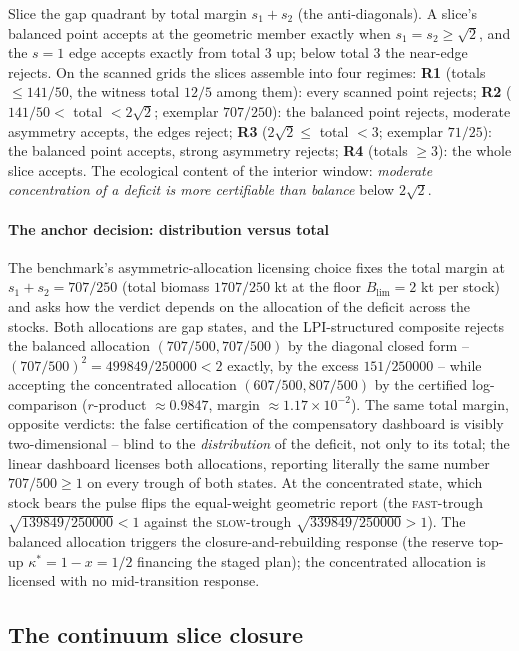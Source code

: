 \documentclass[preprint,11pt,authoryear]{elsarticle}
\theoremstyle{remark}
\newcommand{\act}[1]{\textsc{#1}}
\begin{document}
Slice the gap quadrant by total margin $s_1+s_2$ (the anti-diagonals). A slice's balanced point accepts at the geometric member exactly when $s_1=s_2\ge\sqrt2$, and the $s=1$ edge accepts exactly from total $3$ up; below total $3$ the near-edge rejects. On the scanned grids the slices assemble into four regimes: \textbf{R1} (totals $\le141/50$, the witness total $12/5$ among them): every scanned point rejects; \textbf{R2} ($141/50<$ total $<2\sqrt2$; exemplar $707/250$): the balanced point rejects, moderate asymmetry accepts, the edges reject; \textbf{R3} ($2\sqrt2\le$ total $<3$; exemplar $71/25$): the balanced point accepts, strong asymmetry rejects; \textbf{R4} (totals $\ge3$): the whole slice accepts. The ecological content of the interior window: \emph{moderate concentration of a deficit is more certifiable than balance} below $2\sqrt2$.

\paragraph{The anchor decision: distribution versus total} The benchmark's asymmetric-allocation licensing choice fixes the total margin at $s_1+s_2=707/250$ (total biomass $1707/250$ kt at the floor $B_{\mathrm{lim}}=2$ kt per stock) and asks how the verdict depends on the allocation of the deficit across the stocks. Both allocations are gap states, and the LPI-structured composite rejects the balanced allocation $(707/500,707/500)$ by the diagonal closed form -- $(707/500)^2=499849/250000<2$ exactly, by the excess $151/250000$ -- while accepting the concentrated allocation $(607/500,807/500)$ by the certified log-comparison ($r$-product $\approx0.9847$, margin $\approx1.17\times10^{-2}$). The same total margin, opposite verdicts: the false certification of the compensatory dashboard is visibly two-dimensional -- blind to the \emph{distribution} of the deficit, not only to its total; the linear dashboard licenses both allocations, reporting literally the same number $707/500\ge1$ on every trough of both states. At the concentrated state, which stock bears the pulse flips the equal-weight geometric report (the \act{fast}-trough $\sqrt{139849/250000}<1$ against the \act{slow}-trough $\sqrt{339849/250000}>1$). The balanced allocation triggers the closure-and-rebuilding response (the reserve top-up $\kappa^*=1-x=1/2$ financing the staged plan); the concentrated allocation is licensed with no mid-transition response.

\subsection{The continuum slice closure}
\end{document}

